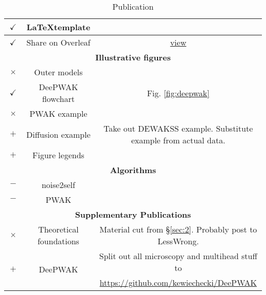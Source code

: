\begin{table}[]
    \centering
    \begin{tabular}{cc|c}
    \hline
$\boxed{\checkmark}$ & \LaTeX template & \\
\hline
$\boxed{\checkmark}$ & Share on Overleaf & 
\hyperlink{https://www.overleaf.com/read/mcvdvdfyfthn#fb5a8e}{view} \\
\hline
\multicolumn{3}{c}{\textbf{Illustrative figures}} \\
\hline
$\boxed{\times}$ & Outer models & \\
\hline
$\boxed{\checkmark}$ & DeePWAK flowchart & Fig. \ref{fig:deepwak} \\
\hline
$\boxed{\times}$ & PWAK example & \\
\hline
$\boxed{+}$ & Diffusion example & Take out DEWAKSS example. Substitute example from actual data. \\
\hline
$\boxed{+}$ & Figure legends & \\
\hline
\multicolumn{3}{c}{\textbf{Algorithms}} \\
\hline
$\boxed{-}$ & noise2self & \\
\hline
$\boxed{-}$ & PWAK & \\
\hline
\multicolumn{3}{c}{\textbf{Supplementary Publications}} \\
\hline
$\boxed{\times}$ & Theoretical foundations & Material cut from \S \ref{sec:2}. Probably post to LessWrong. \\
\hline
\multirow{2}{*}{$\boxed{+}$} & \multirow{2}{*}{DeePWAK} & Split out all microscopy and multihead stuff to \\
& & \url{https://github.com/kewiechecki/DeePWAK} \\
\hline
    \end{tabular}
    \caption{Publication}
    \label{tab:pub}
\end{table}